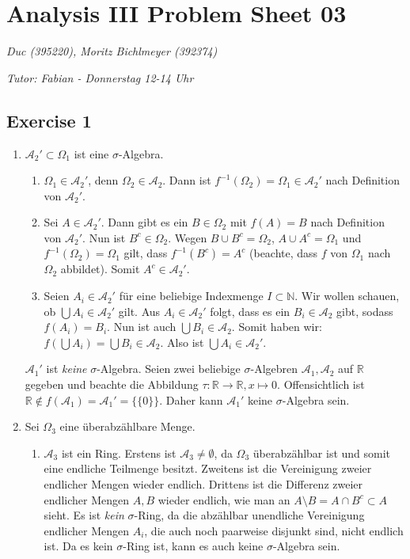 \documentclass[a4paper]{article}
\begin{document}
\section*{Analysis III Problem Sheet 03}
\textit{Duc (395220), Moritz Bichlmeyer (392374)}

\noindent\textit{Tutor: Fabian - Donnerstag 12-14 Uhr}


\subsection*{Exercise 1}
\begin{enumerate}[label=(\roman*)]
\item $\mathcal A_2' \subset \Omega_1$ ist eine $\sigma$-Algebra. 
\begin{enumerate}
\item $\Omega_1 \in \mathcal A_2'$, denn $\Omega_2 \in \mathcal A_2$. Dann ist $f^{-1}(\Omega_2) = \Omega_1 \in  \mathcal A_2'$ nach Definition von $\mathcal A_2'$.

\item Sei $A \in \mathcal A_2'$. Dann gibt es ein $B \in \Omega_2$ mit $f(A) = B$ nach Definition von $\mathcal A_2'$. Nun ist $B^c \in \Omega_2$. Wegen $B \cup B^c = \Omega_2$, $A \cup A^c = \Omega_1$ und $f^{-1}(\Omega_2) = \Omega_1$ gilt, dass $f^{-1}(B^c) = A^c$ (beachte, dass $f$ von $\Omega_1$ nach $\Omega_2$ abbildet). Somit $A^c \in \mathcal A_2'$.

\item Seien $A_i \in \mathcal A_2'$ für eine beliebige Indexmenge $I \subset \mathbb N$. Wir wollen schauen, ob $\bigcup A_i \in \mathcal A_2'$ gilt. Aus $A_i \in \mathcal A_2'$ folgt, dass es ein $B_i \in \mathcal A_2$ gibt, sodass $f(A_i) = B_i$. Nun ist auch $\bigcup B_i \in \mathcal A_2$. Somit haben wir: $f(\bigcup A_i) = \bigcup B_i \in \mathcal A_2$. Also ist $\bigcup A_i \in \mathcal A_2'$.
\end{enumerate}

$\mathcal A_1'$ ist \emph{keine} $\sigma$-Algebra. Seien zwei beliebige $\sigma$-Algebren $\mathcal A_1, \mathcal A_2$ auf $\mathbb R$ gegeben und beachte die Abbildung $\tau: \mathbb R \to \mathbb R, x \mapsto 0$. Offensichtlich ist $\mathbb R \notin f(\mathcal A_1) = \mathcal A_1' = \{ \{ 0 \} \}$. Daher kann $\mathcal A_1'$ keine $\sigma$-Algebra sein.

\item Sei $\Omega_3$ eine überabzählbare Menge.
\begin{enumerate}
\item $\mathcal A_3$ ist ein Ring. Erstens ist $\mathcal A_3 \neq \emptyset$, da $\Omega_3$ überabzählbar ist und somit eine endliche Teilmenge besitzt. Zweitens ist die Vereinigung zweier endlicher Mengen wieder endlich. Drittens ist die Differenz zweier endlicher Mengen $A,B$ wieder endlich, wie man an $A \setminus B = A \cap B^c \subset A$ sieht. Es ist \emph{kein} $\sigma$-Ring, da die abzählbar unendliche Vereinigung endlicher Mengen $A_i$, die auch noch paarweise disjunkt sind, nicht endlich ist. Da es kein $\sigma$-Ring ist, kann es auch keine $\sigma$-Algebra sein.


\end{enumerate}
\end{enumerate}
\end{document}
